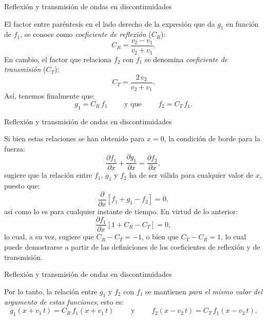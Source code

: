 \documentclass[11pt,handout,aspectratio=1610]{beamer}
\newcommand{\pdiff}[2]{\frac{\partial #1}{\partial #2}}
\begin{document}
\begin{frame}{Reflexión y transmisión de ondas en discontinuidades}

    El factor entre paréntesis en el lado derecho de la expresión que da $g_1$ en función de $f_1$, se conoce como \emph{coeficiente de reflexión} ($C_R$): $$ C_R = \frac{v_2 - v_1}{v_2 + v_1}. $$ En cambio, el factor que relaciona $f_2$ con $f_1$ se denomina \emph{coeficiente de transmisión} ($C_T$): $$ C_T = \frac{2 \, v_2}{v_2 + v_1}. $$ Así, tenemos finalmente que: $$ g_1 = C_R \, f_1 \qquad \text{ y que } \qquad f_2 = C_T \, f_1. $$

\end{frame}

\begin{frame}{Reflexión y transmisión de ondas en discontinuidades}

    Si bien estas relaciones se han obtenido para $x=0$, la condición de borde para la fuerza: $$ \pdiff{f_1}{x} + \pdiff{g_1}{x} = \pdiff{f_2}{x}, $$ sugiere que la relación entre $f_1$, $g_1$ y $f_2$ ha de ser válida para cualquier valor de $x$, puesto que: $$ \pdiff{}{x} \left[f_1 + g_1 - f_2\right] = 0, $$ así como lo es para cualquier instante de tiempo. En virtud de lo anterior: $$ \pdiff{f_1}{x} \left[1 + C_R - C_T\right] = 0, $$ lo cual, a su vez, sugiere que $C_R - C_T = -1 $, o bien que $C_T - C_R = 1$, lo cual puede demostrarse a partir de las definiciones de los coeficientes de reflexión y de transmisión.
 
\end{frame}

\begin{frame}{Reflexión y transmisión de ondas en discontinuidades}   

    Por lo tanto, la relación entre $g_1$ y $f_2$ con $f_1$ se mantienen \emph{para el mismo valor del argumento de estas funciones}, esto es: $$ g_1 \left(x + v_1 \, t\right) = C_R \, f_1 \left(x + v_1 \, t\right) \qquad \text{ y } \qquad f_2 \left(x - v_2 \, t\right) = C_T \, f_1 \left(x - v_2 \, t\right). $$


\end{frame}
\end{document}

